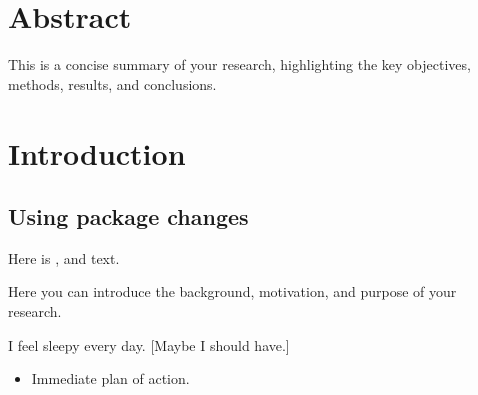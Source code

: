 \documentclass{article}
\begin{document}
\section*{Abstract}

This is a concise summary of your research, highlighting the key objectives, methods, results, and conclusions. 

\section{Introduction}

\subsection{Using package changes}

Here is ,  and  text. 


Here you can introduce the background, motivation, and purpose of your research. 

I feel sleepy every day.  [Maybe I should have.]

\begin{itemize}
  \item Immediate plan of action.
\end{itemize}

\end{document}
